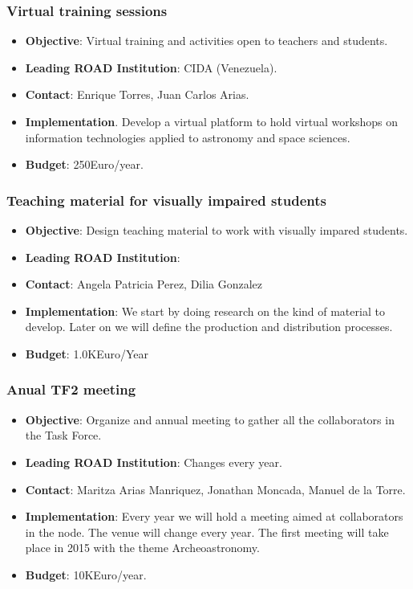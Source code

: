 \documentclass[12pt]{article}
\begin{document}
\subsubsection{Virtual training sessions}
\begin{itemize}
\item {\bf Objective}: Virtual training and activities open to
  teachers and students. 
\item {\bf Leading ROAD Institution}: CIDA (Venezuela).
\item {\bf Contact}: Enrique Torres, Juan Carlos Arias.
\item {\bf Implementation}. Develop a virtual platform to hold virtual
  workshops on information technologies applied to astronomy and space
  sciences.
\item {\bf Budget}: 250Euro/year.
\end{itemize}

\subsubsection{Teaching material for visually impaired students}
\begin{itemize}
\item {\bf Objective}: Design teaching material to work with visually
  impared students. 
\item {\bf Leading ROAD Institution}: 
\item {\bf Contact}: Angela Patricia Perez, Dilia Gonzalez
\item {\bf Implementation}: We start by doing research on the kind of
  material to develop. Later on we will define the production and
  distribution processes. 
\item {\bf Budget}: 1.0KEuro/Year
\end{itemize}

\subsubsection{Anual TF2 meeting}
\begin{itemize}
\item {\bf Objective}: 
Organize and annual meeting to gather all the
  collaborators in the Task Force.
\item {\bf Leading ROAD Institution}: Changes every year.
\item {\bf Contact}: Maritza Arias Manriquez, Jonathan Moncada, Manuel
  de la Torre.
\item {\bf Implementation}: 
Every year we will hold a meeting aimed at collaborators in the
node. The venue will change every year. The first meeting will take
place in 2015 with the theme Archeoastronomy.
\item {\bf Budget}: 10KEuro/year.
\end{itemize}
\end{document}
